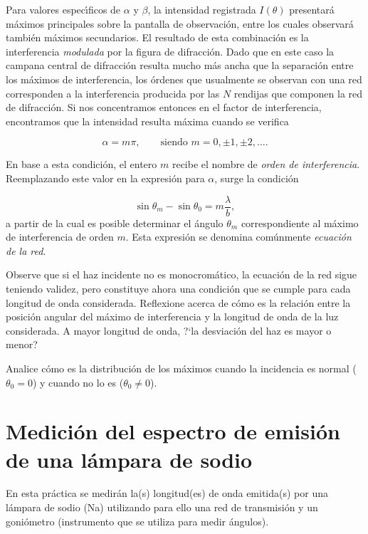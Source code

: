 \documentclass[epj]{svjour}
\begin{document}
Para valores espec\'\i ficos de $\alpha$ y $\beta$, la intensidad registrada
$I(\theta)$ presentar\'a m\'aximos principales sobre la pantalla de 
observaci\'on, entre los cuales observar\'a tambi\'en m\'aximos secundarios.
El resultado de esta combinaci\'on es la interferencia {\it modulada} por
la figura de difracci\'on. Dado que en este caso la campana central de 
difracci\'on resulta mucho m\'as ancha que la separaci\'on entre los m\'aximos
de interferencia, los \'ordenes que usualmente se observan con una red 
corresponden a la interferencia producida por las $N$ rendijas que componen
la red de difracci\'on. Si nos concentramos entonces en el factor de 
interferencia, encontramos que la intensidad resulta m\'axima cuando se
verifica

\begin{equation}
    \alpha = m \pi, \quad \quad \text{siendo } m = 0, \pm 1, \pm 2, \ldots.
\end{equation}

En base a esta condici\'on, el entero $m$ recibe el nombre de {\it orden de
interferencia}. Reemplazando este valor en la expresi\'on para $\alpha$, 
surge la condici\'on

\begin{equation}
    \sin \theta_m - \sin \theta_0 = m \frac{\lambda}{b},
\end{equation}
a partir de la cual es posible determinar el \'angulo $\theta_m$ 
correspondiente al m\'aximo de interferencia de orden $m$. Esta expresi\'on
se denomina com\'unmente {\it ecuaci\'on de la red}. 

Observe que si el haz incidente no es monocrom\'atico, la ecuaci\'on de la
red sigue teniendo validez, pero constituye ahora una condici\'on que se
cumple para cada longitud de onda considerada. Reflexione acerca de c\'omo es
la relaci\'on entre la posici\'on angular del m\'aximo de interferencia y la
longitud de onda de la luz considerada. A mayor longitud de onda, ?`la 
desviaci\'on del haz es mayor o menor?

Analice c\'omo es la distribuci\'on de los m\'aximos cuando la incidencia 
es normal ($\theta_0 = 0$) y cuando no lo es ($\theta_0 \neq 0$). 

\section{Medici\'on del espectro de emisi\'on de una l\'ampara de sodio}

En esta pr\'actica se medir\'an la(s) longitud(es) de onda emitida(s) por una
l\'ampara de sodio (Na) utilizando para ello una red de transmisi\'on y un 
goni\'ometro (instrumento que se utiliza para medir \'angulos).
\end{document}
